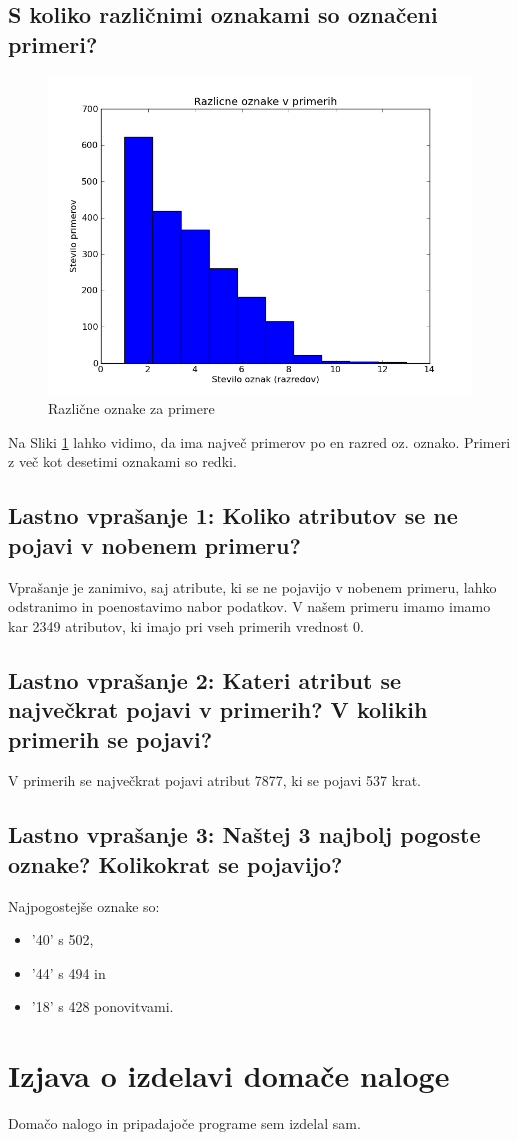 \documentclass[a4paper,11pt]{article}
\begin{document}
\subsection*{S koliko različnimi oznakami so označeni primeri?}
\begin{figure}[H]
\begin{center}
\includegraphics[scale=0.5]{labels.png}
\caption{Različne oznake za primere}
\label{oznake}
\end{center}
\end{figure}
Na Sliki \ref{oznake} lahko vidimo, da ima največ primerov po en razred oz. oznako. Primeri z več kot desetimi oznakami so redki.

\subsection*{Lastno vprašanje 1: Koliko atributov se ne pojavi v nobenem primeru?}
Vprašanje je zanimivo, saj atribute, ki se ne pojavijo v nobenem primeru, lahko odstranimo in poenostavimo nabor podatkov. V našem primeru imamo imamo kar 2349 atributov, ki imajo pri vseh primerih vrednost 0.

\subsection*{Lastno vprašanje 2: Kateri atribut se največkrat pojavi v primerih? V kolikih primerih se pojavi?}
V primerih se največkrat pojavi atribut 7877, ki se pojavi 537 krat.

\subsection*{Lastno vprašanje 3: Naštej 3 najbolj pogoste oznake? Kolikokrat se pojavijo?}
Najpogostejše oznake so:
\begin{itemize}
\item '40' s 502,
\item '44' s 494 in
\item '18' s 428 ponovitvami.
\end{itemize}

\section{Izjava o izdelavi domače naloge}
Domačo nalogo in pripadajoče programe sem izdelal sam.
\end{document}

